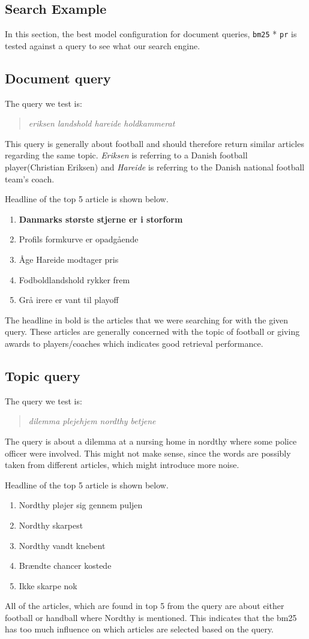 \subsection{Search Example}
In this section, the best model configuration for document queries, \texttt{\gls{bm25}} * \texttt{\gls{pr}} is tested against a query to see what our search engine.


\subsection{Document query}
The query we test is:
\begin{quotation}
	\textit{eriksen landshold hareide holdkammerat}
\end{quotation}
This query is generally about football and should therefore return similar articles regarding the same topic.
\textit{Eriksen} is referring to a Danish football player(Christian Eriksen) and \textit{Hareide} is referring to the Danish national football team's coach.


\noindent Headline of the top 5 article is shown below.
\begin{enumerate}
	\item \textbf{Danmarks største stjerne er i storform}
	\item Profils formkurve er opadgående
	\item Åge Hareide modtager pris
	\item Fodboldlandshold rykker frem
	\item Grå irere er vant til playoff
\end{enumerate}
The headline in bold is the articles that we were searching for with the given query. 
These articles are generally concerned with the topic of football or giving awards to players/coaches which indicates good retrieval performance.


\subsection{Topic query}
The query we test is:
\begin{quotation}
	\textit{dilemma plejehjem nordthy betjene}
\end{quotation}
The query is about a dilemma at a nursing home in nordthy where some police officer were involved. 
This might not make sense, since the words are possibly taken from different articles, which might introduce more noise.

\noindent Headline of the top 5 article is shown below.
\begin{enumerate}
	\item Nordthy pløjer sig gennem puljen
	\item Nordthy skarpest
	\item Nordthy vandt knebent
	\item Brændte chancer kostede
	\item Ikke skarpe nok
\end{enumerate}
All of the articles, which are found in top 5 from the query are about either football or handball where Nordthy is mentioned.
This indicates that the \gls{bm25} has too much influence on which articles are selected based on the query.

